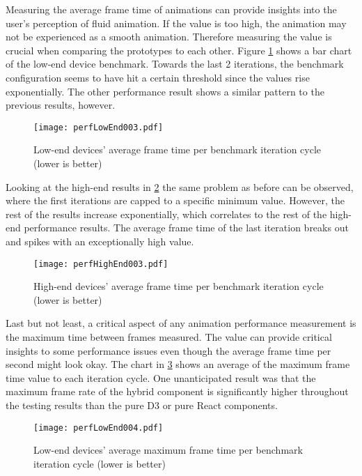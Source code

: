 
Measuring the average frame time of animations can provide insights into the user's perception of fluid animation. If the value is too high, the animation may not be experienced as a smooth animation. Therefore measuring the value is crucial when comparing the prototypes to each other. Figure \ref{fig:perfLowEnd003} shows a bar chart of the low-end device benchmark. Towards the last 2 iterations, the benchmark configuration seems to have hit a certain threshold since the values rise exponentially. The other performance result shows a similar pattern to the previous results, however.

\begin{figure}
\centering
\texttt{[image: perfLowEnd003.pdf]}
\caption{Low-end devices' average frame time per benchmark iteration cycle (lower is better)}
\label{fig:perfLowEnd003}
\end{figure}

Looking at the high-end results in \ref{fig:perfHighEnd003} the same problem as before can be observed, where the first iterations are capped to a specific minimum value. However, the rest of the results increase exponentially, which correlates to the rest of the high-end performance results. The average frame time of the last iteration breaks out and spikes with an exceptionally high value.

\begin{figure}
\centering
\texttt{[image: perfHighEnd003.pdf]}
\caption{High-end devices' average frame time per benchmark iteration cycle (lower is better)}
\label{fig:perfHighEnd003}
\end{figure}

Last but not least, a critical aspect of any animation performance measurement is the maximum time between frames measured. The value can provide critical insights to some performance issues even though the average frame time per second might look okay. The chart in \ref{fig:perfLowEnd004} shows an average of the maximum frame time value to each iteration cycle. One unanticipated result was that the maximum frame rate of the hybrid component is significantly higher throughout the testing results than the pure D3 or pure React components.

\begin{figure}
\centering
\texttt{[image: perfLowEnd004.pdf]}
\caption{Low-end devices' average maximum frame time per benchmark iteration cycle (lower is better)}
\label{fig:perfLowEnd004}
\end{figure}

